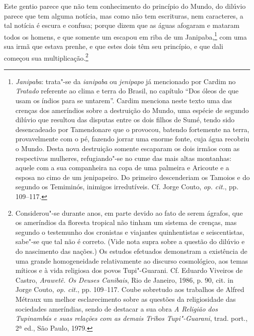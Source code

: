 \begin{linenumbers}

Este gentio parece que não tem conhecimento do
princípio do Mundo, do dilúvio parece que tem alguma notícia, mas como
não tem escrituras, nem caracteres, a tal notícia é escura e confusa;
porque dizem que as águas afogaram e mataram todos os homens, e que
somente um escapou em riba de um Janipaba,\footnote{ \textit{Janipaba}: 
trata"-se da \textit{ianipaba} ou \textit{jenipapo} já mencionado por
Cardim no \textit{Tratado} referente ao clima e terra do Brasil, no
capítulo ``Dos óleos de que usam os índios para se untarem''. Cardim
menciona neste texto uma das crenças dos ameríndios sobre a destruição
do Mundo, uma espécie de segundo dilúvio que resultou das disputas
entre os dois filhos de Sumé, tendo sido desencadeado por Tamendonare
que o provocou, batendo fortemente na terra, provavelmente com o pé,
fazendo jorrar uma enorme fonte, cuja água recobriu o Mundo. Desta nova
destruição somente escaparam os dois irmãos com as respectivas
mulheres, refugiando"-se no cume das mais altas montanhas: aquele com a
sua companheira na copa de uma palmeira e Aricoute e a esposa no cimo
de um jenipapeiro. Do primeiro descenderiam os Tamoios e do segundo os
Temiminós, inimigos irredutíveis. Cf. Jorge Couto, \textit{op. cit.}, pp. 109--117.} 
com uma sua irmã que estava prenhe, e que estes dois têm
seu princípio, e que dali começou sua multiplicação.\footnote{ Considerou"-se 
durante anos, em parte devido ao fato de serem ágrafos,
que os ameríndios da floresta tropical não tinham um sistema de
crenças, mas segundo o testemunho dos cronistas e viajantes
quinhentistas e seiscentistas, sabe"-se que tal não é correto. (Vide
nota supra sobre a questão do dilúvio e do nascimento das nações.) Os
estudos efetuados demonstram a existência de uma grande homogeneidade
relativamente ao discurso cosmológico, aos temas míticos e à vida
religiosa dos povos Tupi"-Guarani. Cf. Eduardo Viveiros de Castro,
\textit{Arawetê. Os Deuses Canibais}, Rio de Janeiro, 1986, p. 90, cit.
in Jorge Couto, \textit{op. cit.}, pp. 109--117. Coube sobretudo aos
trabalhos de Alfred Métraux um melhor esclarecimento sobre as questões
da religiosidade das sociedades ameríndias, sendo de destacar a sua
obra \textit{A Religião dos Tupinambás e suas relações com as demais
Tribos Tupi"-Guarani}, trad. port., 2ª ed., São Paulo, 1979.} 


\end{linenumbers}

